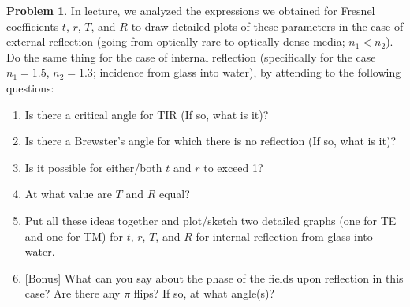 \documentclass[10pt]{article}
\theoremstyle{definition}
\newtheorem{problem}{Problem}
\begin{document}
\begin{problem}
In lecture, we analyzed the expressions we obtained for Fresnel coefficients $t$, $r$, $T$,
and $R$ to draw detailed plots of these parameters in the case of external reflection
(going from optically rare to optically dense media; $n_1<n_2$). Do the same thing for
the case of internal reflection (specifically for the case $n_1=1.5$, $n_2=1.3$; incidence
from glass into water), by attending to the following questions:
\begin{enumerate}[label=(\alph*)]
  \item Is there a critical angle for TIR (If so, what is it)?
  \item Is there a Brewster's angle for which there is no reflection (If so, what is it)?
  \item Is it possible for either/both $t$ and $r$ to exceed 1?
  \item At what value are $T$ and $R$ equal?
  \item Put all these ideas together and plot/sketch two detailed graphs (one for TE and one
        for TM) for $t$, $r$, $T$, and $R$ for internal reflection from glass into water.
  \item {[Bonus]} What can you say about the phase of the fields upon reflection in this
        case? Are there any $\pi$ flips? If so, at what angle(s)?
\end{enumerate}
\end{problem}
\end{document}
